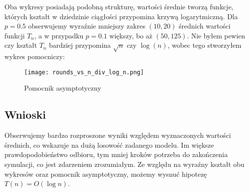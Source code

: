 \documentclass{article}
\begin{document}
Oba wykresy posiadają podobną strukturę, wartości średnie tworzą funkcje, których kształt w dziedzinie ciągłości przypomina krzywą logarytmiczną. Dla $p=0.5$ obserwujemy wyraźnie mniejszy zakres $(10,20)$ średnich wartości funkcji $T_n$, a w przypadku $p=0.1$ większy, bo aż $(50,125)$.
Nie byłem pewien czy kształt $T_n$ bardziej przypomina $\sqrt{n}$ czy $\log(n)$, wobec tego stworzyłem wykres pomocniczy:

\begin{figure}[H]
    \centering
    \texttt{[image: rounds\_vs\_n\_div\_log\_n.png]}
    \caption{Pomocnik asymptotyczny}
    \label{fig:enter-label}
\end{figure}

\subsection{Wnioski}

Obserwujemy bardzo rozproszone wyniki względem wyznaczonych wartości średnich, co wskazuje na dużą losowość zadanego modelu. Im większe prawdopodobieństwo odbioru, tym mniej kroków potrzeba do zakończenia symulacji, co jest zdarzeniem zrozumiałym. Ze względu na wyraźny kształt obu wykresów oraz pomocnik asymptotyczny, możemy wysnuć hipotezę $T(n)=O(\log n)$.
\end{document}
